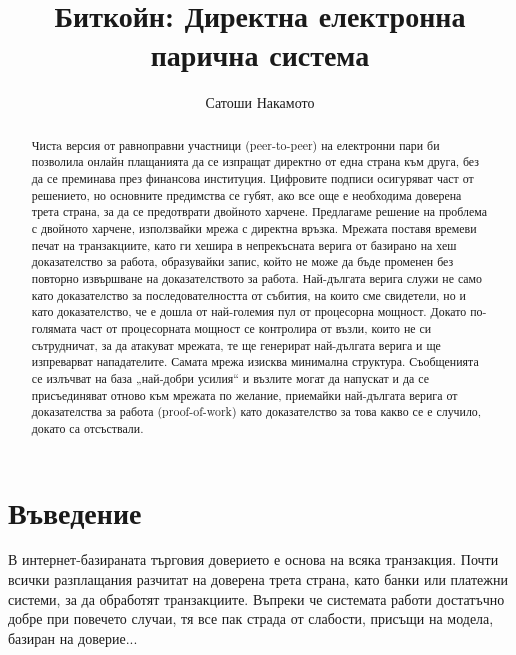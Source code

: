 \documentclass[11pt,a4paper]{article}
\title{\textbf{Биткойн: Директна електронна парична система}}
\author{Сатоши Накамото}
\date{}
\begin{document}
\maketitle

\begin{abstract}
Чистa версия от равноправни участници (peer-to-peer) на електронни пари би позволила онлайн плащанията да се изпращат директно от една страна към друга, без да се преминава през финансова институция. Цифровите подписи осигуряват част от решението, но основните предимства се губят, ако все още е необходима доверена трета страна, за да се предотврати двойното харчене. Предлагаме решение на проблема с двойното харчене, използвайки мрежа с директна връзка. Мрежата поставя времеви печат на транзакциите, като ги хешира в непрекъсната верига от базирано на хеш доказателство за работа, образувайки запис, който не може да бъде променен без повторно извършване на доказателството за работа. Най-дългата верига служи не само като доказателство за последователността от събития, на които сме свидетели, но и като доказателство, че е дошла от най-големия пул от процесорна мощност. Докато по-голямата част от процесорната мощност се контролира от възли, които не си сътрудничат, за да атакуват мрежата, те ще генерират най-дългата верига и ще изпреварват нападателите. Самата мрежа изисква минимална структура. Съобщенията се излъчват на база „най-добри усилия“ и възлите могат да напускат и да се присъединяват отново към мрежата по желание, приемайки най-дългата верига от доказателства за работа (proof-of-work) като доказателство за това какво се е случило, докато са отсъствали.
\end{abstract}

\section{Въведение}

В интернет-базираната търговия доверието е основа на всяка транзакция. Почти всички разплащания разчитат на доверена трета страна, като банки или платежни системи, за да обработят транзакциите. Въпреки че системата работи достатъчно добре при повечето случаи, тя все пак страда от слабости, присъщи на модела, базиран на доверие...

\end{document}
